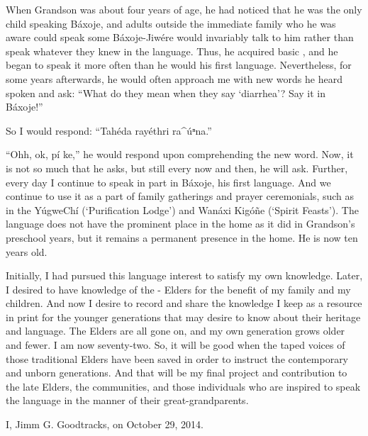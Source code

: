 \documentclass[output=paper]{LSP/langsci}
\begin{document}
When Grandson was about four years of age, he had noticed that he was the only child speaking Báxoje, and adults outside the immediate family who he was aware could speak some Báxoje-Jiwére would invariably talk  to him rather than speak whatever they knew in the language. Thus, he acquired basic , and he began to speak it more often than he would his first language. Nevertheless, for some years afterwards, he would often approach me with new  words he heard spoken and ask: ``What do they mean when they say `diarrhea'? Say it in Báxoje!''

So I would respond: ``Tahéda rayéthri ra\^{ }úⁿna.''
	
``Ohh, ok, pí ke,'' he would respond upon comprehending the new word. Now, it is not so much that he asks, but still every now and then, he will ask. Further, every day I continue to speak in part in Báxoje, his first language. And we continue to use it as a part of family gatherings and prayer ceremonials, such as in the YúgweChí (`Purification Lodge') and Wanáxi Kigóñe (`Spirit Feasts'). The language does not have the prominent place in the home as it did in Grandson's preschool years, but it remains a permanent presence in the home. He is now ten years old.

Initially, I had pursued this language interest to satisfy my own knowledge. Later, I desired to have knowledge of the - Elders for the benefit of my family and my children. And now I desire to record and share the knowledge I keep as a resource in print for the younger generations that may desire to know about their heritage and language. The Elders are all gone on, and my own generation grows older and fewer. I am now seventy-two. So, it will be good when the taped voices of those traditional Elders have been saved in order to instruct the contemporary and unborn generations. And that will be my final project and contribution to the late Elders, the communities, and those individuals who are inspired to speak the language in the manner of their great-grandparents.

I, Jimm G. Goodtracks, on October 29, 2014.
\end{document}
